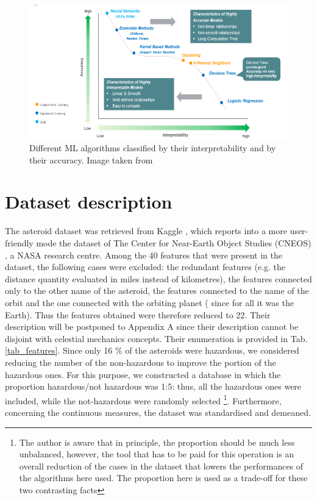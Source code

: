 \documentclass[12pt,%
               a4paper,%
               oneside,openany,%
               titlepage,%
               headinclude,footinclude,%
               BCOR5mm,%
               cleardoublepage=empty,%
               tablecaptionabove,%
               floatperchapter,
               ]{scrreprt}                 %
\begin{document}
\begin{figure}[h]
\begin{center}
\includegraphics[width=1\textwidth]{Figures/ML_intepretability.png}
\caption{Different ML algorithms classified by their interpretability and by their accuracy. Image taken from \cite{ml_interpretability}}
\label{ML_intepretability}
\end{center}
\end{figure}


\chapter{Dataset description}

The asteroid dataset was retrieved from Kaggle \cite{kaggle_dataset}, which reports into a more user-friendly mode the dataset of The Center for Near-Earth Object Studies (CNEOS) \cite{cneos+nasa}, a NASA research centre. Among the 40 features that were present in the dataset,  the following cases were excluded: the redundant features (e.g. the distance quantity evaluated in miles instead of kilometres), the features connected only to the other name of the asteroid, the features connected to the name of the orbit and the one connected with the orbiting planet ( since for all it was the Earth). Thus the features obtained were therefore reduced to 22. Their description will be postponed to Appendix A since their description cannot be disjoint with celestial mechanics concepts. Their enumeration is provided in Tab. \ref{tab_features}. Since only 16 \% of the asteroids were hazardous, we considered reducing the number of the non-hazardous to improve the portion of the hazardous ones. For this purpose, we constructed a database in which the proportion hazardous/not hazardous was 1:5: thus, all the hazardous ones were included, while the not-hazardous were randomly selected \footnote{The author is aware that in principle, the proportion should be much less unbalanced, however, the tool that has to be paid for this operation is an overall reduction of the cases in the dataset that lowers the performances of the algorithms here used. The proportion here is used as a trade-off for these two contrasting facts}. Furthermore, concerning the continuous measures, the dataset was standardised and demeaned. 
\end{document}
